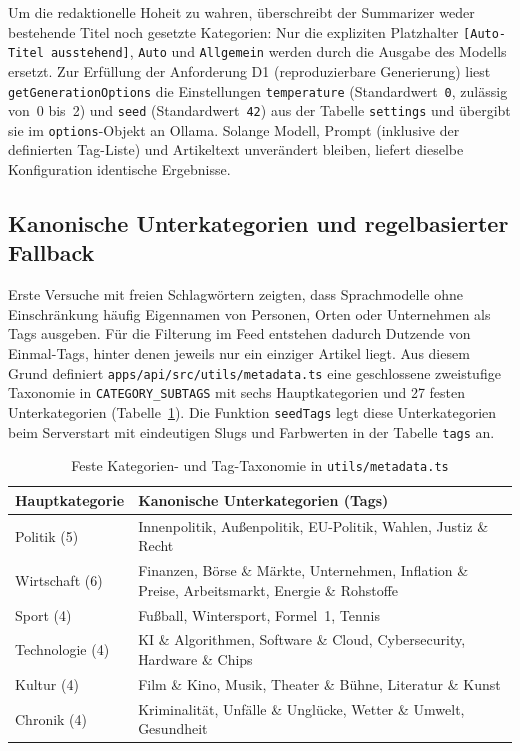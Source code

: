 Um die redaktionelle Hoheit zu wahren, überschreibt der Summarizer weder bestehende Titel noch gesetzte Kategorien: Nur die expliziten Platzhalter \texttt{[Auto-Titel ausstehend]}, \texttt{Auto} und \texttt{Allgemein} werden durch die Ausgabe des Modells ersetzt.
Zur Erfüllung der Anforderung D1 (reproduzierbare Generierung) liest \texttt{getGenerationOptions} die Einstellungen \texttt{temperature} (Standardwert~\texttt{0}, zulässig von~0 bis~2) und \texttt{seed} (Standardwert~\texttt{42}) aus der Tabelle \texttt{settings} und übergibt sie im \texttt{options}-Objekt an Ollama.
Solange Modell, Prompt (inklusive der definierten Tag-Liste) und Artikeltext unverändert bleiben, liefert dieselbe Konfiguration identische Ergebnisse.

\subsection{Kanonische Unterkategorien und regelbasierter Fallback}

Erste Versuche mit freien Schlagwörtern zeigten, dass Sprachmodelle ohne Einschränkung häufig Eigennamen von Personen, Orten oder Unternehmen als Tags ausgeben.
Für die Filterung im Feed entstehen dadurch Dutzende von Einmal-Tags, hinter denen jeweils nur ein einziger Artikel liegt.
Aus diesem Grund definiert \texttt{apps/api/src/utils/metadata.ts} eine geschlossene zweistufige Taxonomie in \texttt{CATEGORY\_SUBTAGS} mit sechs Hauptkategorien und 27 festen Unterkategorien (Tabelle~\ref{tab:backend:categories}).
Die Funktion \texttt{seedTags} legt diese Unterkategorien beim Serverstart mit eindeutigen Slugs und Farbwerten in der Tabelle \texttt{tags} an.

\begin{table}
    \centering
    \small
    \begin{tabularx}{\textwidth}{l >{\raggedright\arraybackslash}X}
        \toprule
        \textbf{Hauptkategorie} & \textbf{Kanonische Unterkategorien (Tags)} \\
        \midrule
        Politik (5) & Innenpolitik, Außenpolitik, EU-Politik, Wahlen, Justiz \& Recht \\
        Wirtschaft (6) & Finanzen, Börse \& Märkte, Unternehmen, Inflation \& Preise, Arbeitsmarkt, Energie \& Rohstoffe \\
        Sport (4) & Fußball, Wintersport, Formel~1, Tennis \\
        Technologie (4) & KI \& Algorithmen, Software \& Cloud, Cybersecurity, Hardware \& Chips \\
        Kultur (4) & Film \& Kino, Musik, Theater \& Bühne, Literatur \& Kunst \\
        Chronik (4) & Kriminalität, Unfälle \& Unglücke, Wetter \& Umwelt, Gesundheit \\
        \bottomrule
    \end{tabularx}
    \caption{Feste Kategorien- und Tag-Taxonomie in \texttt{utils/metadata.ts}}
    \label{tab:backend:categories}
\end{table}

